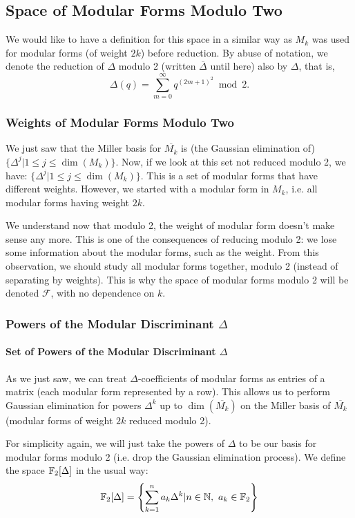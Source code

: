 \subsection{Space of Modular Forms Modulo Two}
We would like to have a definition for this space in a similar way as $M_k$ was used for modular forms (of weight $2k$) before reduction.
By abuse of notation, we denote the reduction of $\Delta$ modulo 2 (written $\overline{\Delta}$ until here) also by $\Delta$, that is,
$$
\Delta(q) = \sum_{m=0}^{\infty} q^{(2m+1)^2} \bmod 2.
$$
\subsubsection{Weights of Modular Forms Modulo Two}
\label{WeightModuloTwo}
We just saw that the Miller basis for $\overline{M_k}$ is (the Gaussian elimination of) $\{ \Delta^j | 1 \leq j \leq \dim(M_k) \}$.
Now, if we look at this set not reduced modulo 2, we have:
$\{ \Delta^j | 1 \leq j \leq \dim(M_k) \}$.
This is a set of modular forms that have different weights.
However, we started with a modular form in $M_k$, i.e. all modular forms having weight $2k$.

We understand now that modulo 2, the weight of modular form doesn't make sense any more.
This is one of the consequences of reducing modulo 2: we lose some information about the modular forms, such as the weight.
From this observation, we should study all modular forms together, modulo 2 (instead of separating by weights).
This is why the space of modular forms modulo 2 will be denoted  $\mathcal{F}$, with no dependence on $k$.

\subsubsection{Powers of the Modular Discriminant $\Delta$}
\paragraph{Set of Powers of the Modular Discriminant $\Delta$}
As we just saw, we can treat $\Delta$-coefficients of modular forms as entries of a matrix (each modular form represented by a row).
This allows us to perform Gaussian elimination for powers $\Delta^k$ up to $\dim(\overline{M_k})$ on the Miller basis of $\overline{M_k}$ (modular forms of weight $2k$ reduced modulo 2).

For simplicity again, we will just take the powers of $\Delta$ to be our basis for modular forms modulo 2 (i.e. drop the Gaussian elimination process).
We define the space $\mathbb{F}_2[\Delta]$ in the usual way:
$$
\mathbb{F}_2[\Delta] = \left\lbrace \sum_{k=1}^{n}a_k \Delta^k | n \in \mathbb{N}, \  a_k \in \mathbb{F}_2 \right\rbrace
$$


